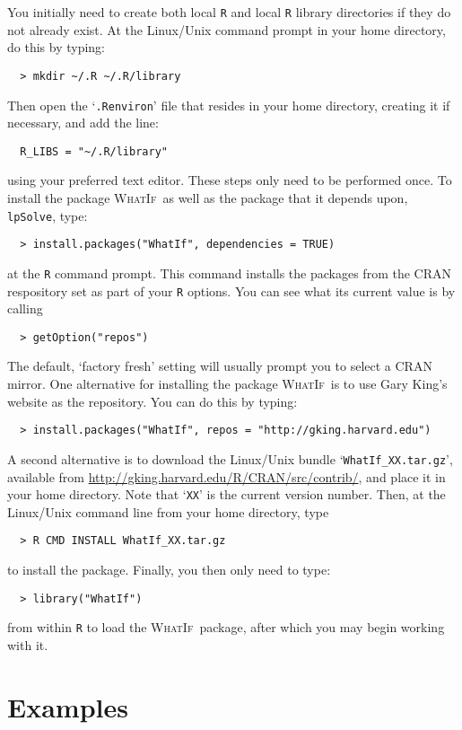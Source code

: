 \documentclass[oneside,letterpaper,titlepage]{article}
\newcommand{\WhatIf}{\textsc{WhatIf}}
\begin{document}
You initially need to create both local \texttt{R} and local
\texttt{R} library directories if they do not already exist.  At the
Linux/Unix command prompt in your home directory, do this by typing:
  \begin{verbatim}
  > mkdir ~/.R ~/.R/library
  \end{verbatim}
Then open the `\texttt{.Renviron}' file that resides in your home directory,
creating it if necessary, and add the line:
  \begin{verbatim}
  R_LIBS = "~/.R/library"
  \end{verbatim}
using your preferred text editor.  These steps only need to be
performed once.  To install the package \WhatIf\ as well as the
package that it depends upon, \texttt{lpSolve}, type:
\begin{verbatim}
  > install.packages("WhatIf", dependencies = TRUE)
\end{verbatim}
at the \texttt{R} command prompt.  This command installs the packages
from the CRAN respository set as part of your \texttt{R} options.  You
can see what its current value is by calling
\begin{verbatim}
  > getOption("repos")
\end{verbatim}
The default, `factory fresh' setting will usually prompt you to select
a CRAN mirror.  One alternative for installing the package \WhatIf\ is
to use Gary King's website as the repository.  You can do this by
typing:
\begin{verbatim}
  > install.packages("WhatIf", repos = "http://gking.harvard.edu")
\end{verbatim}
A second alternative is to download the Linux/Unix bundle
`\texttt{WhatIf\_XX.tar.gz}', available from
\url{http://gking.harvard.edu/R/CRAN/src/contrib/}, and place it in
your home directory.  Note that `\texttt{XX}' is the current version
number.  Then, at the Linux/Unix command line from your home
directory, type
\begin{verbatim}
  > R CMD INSTALL WhatIf_XX.tar.gz
\end{verbatim}
to install the package.  Finally, you then only need to type:
\begin{verbatim}
  > library("WhatIf") 
\end{verbatim}
from within \texttt{R} to load the \WhatIf\ package, after which you
may begin working with it.

\section{Examples}
\end{document}
